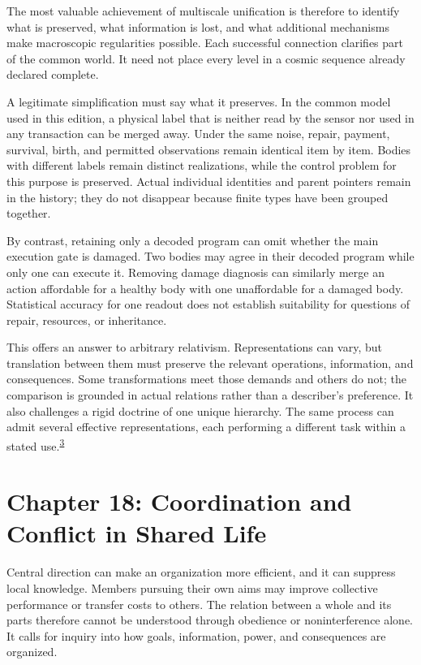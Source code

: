 \documentclass[
  english,
  11pt,
  oneside]{book}
\begin{document}
The most valuable achievement of multiscale unification is therefore to identify what is preserved, what information is lost, and what additional mechanisms make macroscopic regularities possible. Each successful connection clarifies part of the common world. It need not place every level in a cosmic sequence already declared complete.

A legitimate simplification must say what it preserves. In the common model used in this edition, a physical label that is neither read by the sensor nor used in any transaction can be merged away. Under the same noise, repair, payment, survival, birth, and permitted observations remain identical item by item. Bodies with different labels remain distinct realizations, while the control problem for this purpose is preserved. Actual individual identities and parent pointers remain in the history; they do not disappear because finite types have been grouped together.

By contrast, retaining only a decoded program can omit whether the main execution gate is damaged. Two bodies may agree in their decoded program while only one can execute it. Removing damage diagnosis can similarly merge an action affordable for a healthy body with one unaffordable for a damaged body. Statistical accuracy for one readout does not establish suitability for questions of repair, resources, or inheritance.

\begingroup{}

This offers an answer to arbitrary relativism. Representations can vary, but translation between them must preserve the relevant operations, information, and consequences. Some transformations meet those demands and others do not; the comparison is grounded in actual relations rather than a describer's preference. It also challenges a rigid doctrine of one unique hierarchy. The same process can admit several effective representations, each performing a different task within a stated use.\textsuperscript{\hyperlink{ph-note-3}{3}}

\par\endgroup

\chapter{Chapter 18: Coordination and Conflict in Shared Life}\label{ph-ch-18}

Central direction can make an organization more efficient, and it can suppress local knowledge. Members pursuing their own aims may improve collective performance or transfer costs to others. The relation between a whole and its parts therefore cannot be understood through obedience or noninterference alone. It calls for inquiry into how goals, information, power, and consequences are organized.
\end{document}
